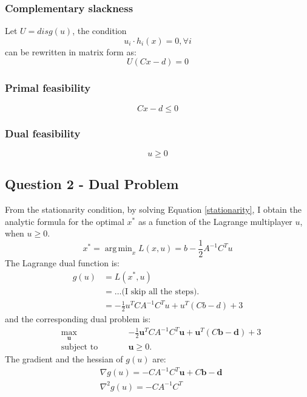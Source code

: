 \documentclass[]{article}
\DeclareMathOperator*{\argmin}{arg\,min}
\begin{document}
\subsubsection*{Complementary slackness}
Let $U=disg(u)$, the condition
\[u_i\cdot h_i(x)=0, \forall i\]
can be rewritten in matrix form as:
\[ U(Cx-d) = 0 \]

\subsubsection*{Primal feasibility}
\[ Cx-d \leq 0\]

\subsubsection*{Dual feasibility}
\[ u\geq0 \]

\subsection*{Question 2 - Dual Problem}
From the stationarity condition, by solving Equation \ref{stationarity}, I obtain the analytic formula for the optimal $x^*$ as a function of the Lagrange multiplayer $u$, when $u\geq0$.
\[
x^* = \argmin_x L(x,u) =  b-\frac{1}{2}A^{-1}C^Tu
\]
The Lagrange dual function is:
\begin{equation*}
	\begin{aligned}
		g(u) &= L(x^*,u)\\
		&=\dots \text{(I skip all the steps).}\\
		&= -\frac{1}{2}u^TCA^{-1}C^Tu+u^T(Cb-d)+3 
	\end{aligned}
\end{equation*}
and the corresponding dual problem is:
\begin{subequations}
	\begin{alignat*}{2}
		&\!\max_{\mathbf{u}} &\qquad& -\frac{1}{2}\mathbf{u}^TCA^{-1}C^T\mathbf{u}+\mathbf{u}^T(C\mathbf{b}-\mathbf{d})+3\\
		&\text{subject to} & & \mathbf{u}\geq 0.
	\end{alignat*}
\end{subequations}
The gradient and the hessian of $g(u)$ are:
\begin{equation*}
	\begin{aligned}
		& \nabla g(u) = -CA^{-1}C^T\mathbf{u}+C\mathbf{b}-\mathbf{d}\\
		& \nabla^2 g(u) =-CA^{-1}C^T
	\end{aligned}
\end{equation*}
\end{document}
